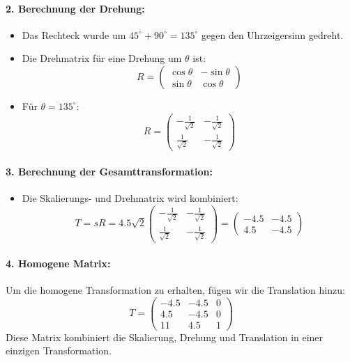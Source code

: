 \documentclass{article}
\begin{document}
\paragraph{2. Berechnung der Drehung:}
\begin{itemize}
    \item Das Rechteck wurde um \( 45^\circ + 90^\circ = 135^\circ \) gegen den Uhrzeigersinn gedreht.
    \item Die Drehmatrix für eine Drehung um \( \theta \) ist:
    \[
    R = \begin{pmatrix}
    \cos\theta & -\sin\theta \\
    \sin\theta & \cos\theta
    \end{pmatrix}
    \]
    \item Für \( \theta = 135^\circ \):
    \[
    R = \begin{pmatrix}
    -\frac{1}{\sqrt{2}} & -\frac{1}{\sqrt{2}} \\
    \frac{1}{\sqrt{2}} & -\frac{1}{\sqrt{2}}
    \end{pmatrix}
    \]
\end{itemize}

\paragraph{3. Berechnung der Gesamttransformation:}
\begin{itemize}
    \item Die Skalierungs- und Drehmatrix wird kombiniert:
    \[
    T = sR = 4.5\sqrt{2} \begin{pmatrix}
    -\frac{1}{\sqrt{2}} & -\frac{1}{\sqrt{2}} \\
    \frac{1}{\sqrt{2}} & -\frac{1}{\sqrt{2}}
    \end{pmatrix} = \begin{pmatrix}
    -4.5 & -4.5 \\
    4.5 & -4.5
    \end{pmatrix}
    \]
\end{itemize}

\paragraph{4. Homogene Matrix:}
Um die homogene Transformation zu erhalten, fügen wir die Translation hinzu:
\[
T = \begin{pmatrix}
-4.5 & -4.5 & 0 \\
4.5 & -4.5 & 0 \\
11 & 4.5 & 1
\end{pmatrix}
\]
Diese Matrix kombiniert die Skalierung, Drehung und Translation in einer einzigen Transformation.
\end{document}
